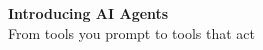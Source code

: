 \documentclass[aspectratio=169,11pt]{beamer}
\begin{document}

\begin{frame}[plain]
\vfill
\begin{center}
{\LARGE\bfseries\textcolor{charcoal}{Introducing AI Agents}}\\[0.35cm]
{\large\textcolor{warmgray}{From tools you prompt to tools that act}}
\end{center}
\vfill
\end{frame}
\end{document}
